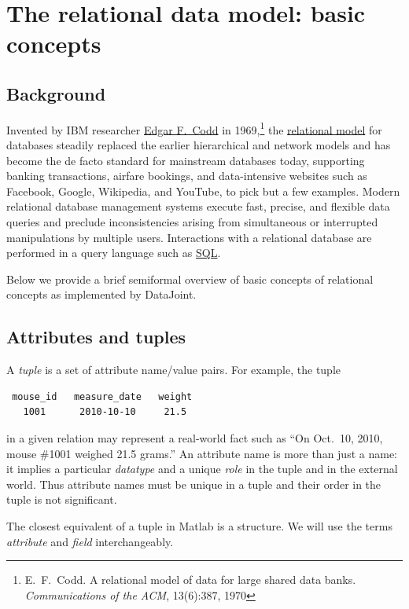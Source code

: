 \documentclass[10pt]{article}
\begin{document}
\newpage\section{The relational data model: basic concepts}
\subsection{Background}
Invented by IBM researcher \href{http://en.wikipedia.org/wiki/Edgar_F._Codd}{Edgar F.~Codd} in 1969,\footnote{E.~F.~Codd. A relational model of data for large shared data banks. {\em Communications of the ACM}, 13(6):387, 1970} the \href{http://en.wikipedia.org/wiki/Relational_model}{relational model} for databases steadily replaced the earlier hierarchical and network models and has become the de facto standard for mainstream databases today, supporting banking transactions, airfare bookings, and data-intensive websites such as Facebook, Google, Wikipedia, and YouTube, to pick but a few examples.  Modern relational database management systems  execute fast, precise, and flexible data queries and preclude inconsistencies arising from simultaneous or interrupted manipulations by multiple users. Interactions with a relational database are performed in a query language such as \href{http://en.wikipedia.org/wiki/SQL}{SQL}. 

Below we provide a brief semiformal overview of basic concepts of relational concepts as implemented by DataJoint.  

\subsection{Attributes and tuples}
A {\em tuple} is a set of attribute name/value pairs. For example, the tuple
\begin{verbatim}
 mouse_id   measure_date   weight 
   1001      2010-10-10     21.5
\end{verbatim}

in a given relation may represent a real-world fact such as ``On Oct.~10, 2010, mouse \#1001 weighed 21.5 grams.''  An attribute name is more than just a name: it implies a particular {\em datatype} and a unique {\em role} in the tuple and in the external world.  Thus attribute names must be unique in a tuple and their order in the tuple is not significant.  

The closest equivalent of a tuple in Matlab is a structure. We will use the terms {\em attribute} and {\em field} interchangeably.
\end{document}

